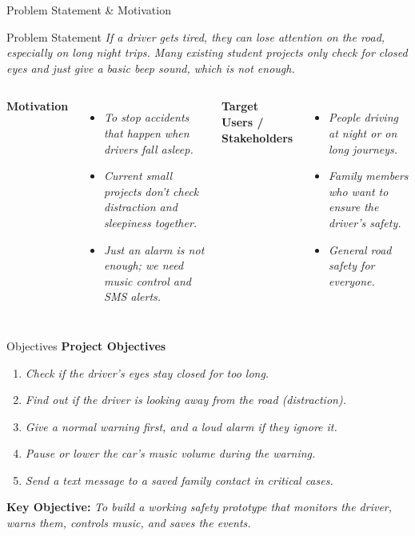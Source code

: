 \documentclass[aspectratio=169,11pt]{beamer}
\newcommand{\placeholder}[1]{\textit{\color{GEUGrey}#1}}
\begin{document}
\begin{frame}{Problem Statement \& Motivation}
\begin{block}{Problem Statement}
\placeholder{If a driver gets tired, they can lose attention on the road, especially on long night trips. Many existing student projects only check for closed eyes and just give a basic beep sound, which is not enough.}
\end{block}
\vspace{-3mm}
\begin{columns}[T,totalwidth=\textwidth]
\textbf{\color{GEUBlue}Motivation}
\vspace{-1mm}
\begin{itemize}\itemsep0pt
\item \placeholder{To stop accidents that happen when drivers fall asleep.}
\item \placeholder{Current small projects don't check distraction and sleepiness together.}
\item \placeholder{Just an alarm is not enough; we need music control and SMS alerts.}
\end{itemize}
\textbf{\color{GEUBlue}Target Users / Stakeholders}
\vspace{-1mm}
\begin{itemize}\itemsep0pt
\item \placeholder{People driving at night or on long journeys.}
\item \placeholder{Family members who want to ensure the driver's safety.}
\item \placeholder{General road safety for everyone.}
\end{itemize}
\end{columns}
\end{frame}

\begin{frame}{Objectives}
\textbf{\color{GEUBlue}Project Objectives}
\vspace{2mm}
\begin{enumerate}\itemsep5pt
\item \placeholder{Check if the driver's eyes stay closed for too long.}
\item \placeholder{Find out if the driver is looking away from the road (distraction).}
\item \placeholder{Give a normal warning first, and a loud alarm if they ignore it.}
\item \placeholder{Pause or lower the car's music volume during the warning.}
\item \placeholder{Send a text message to a saved family contact in critical cases.}
\end{enumerate}
\vfill
\begin{center}
\colorbox{GEULightBlue}{\parbox{.80\textwidth}{\centering
\textbf{Key Objective:} \placeholder{To build a working safety prototype that monitors the driver, warns them, controls music, and saves the events.}}}
\end{center}
\end{frame}
\end{document}
